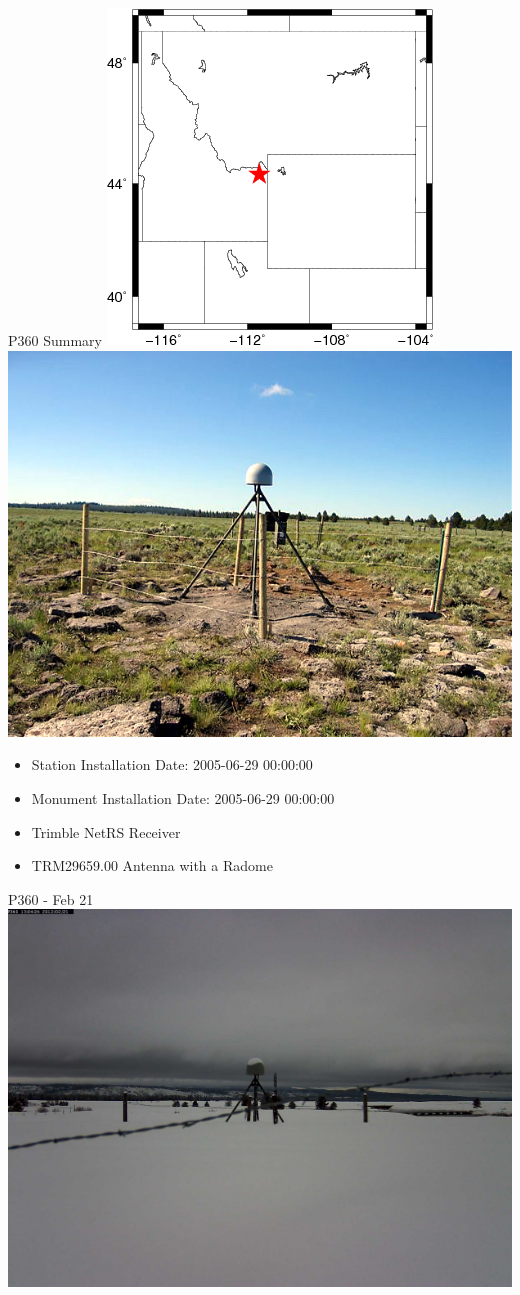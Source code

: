 \documentclass{beamer}
\begin{document}
\begin{frame}{P360 Summary}
\includegraphics[width=0.4\linewidth]{img/map_p360.png}
\includegraphics[width=0.5\linewidth]{img/overview.jpg}
\begin{itemize}  
  \item Station Installation Date: 2005-06-29 00:00:00
  \item Monument Installation Date: 2005-06-29 00:00:00
  \item Trimble NetRS Receiver
  \item TRM29659.00 Antenna with a Radome
\end{itemize}
\end{frame}

\begin{frame}{P360 - Feb 21}
\includegraphics[width=9\linewidth,trim=100 600 100 600]{img/P36020120221_130426M.jpg}
\end{frame}
\end{document}
